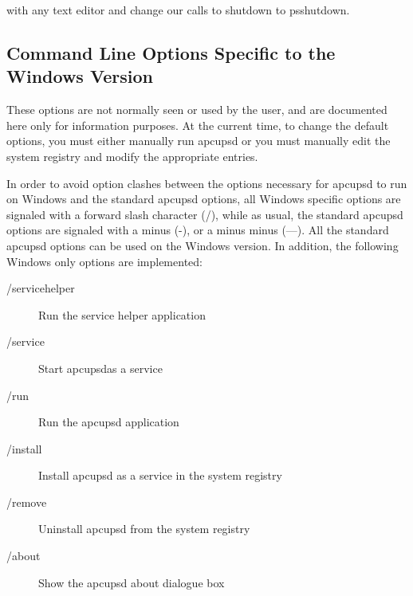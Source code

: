 {{{{{{{{{{with any text editor and change our calls to shutdown to psshutdown. 

\label{Command-Line-Options-Specific-to-the-Windows-Version}

\subsection*{Command Line Options Specific to the Windows Version}

\label{index-Windows_002c-Options-186}
These options are not normally seen or used by the user, and are documented
here only for information purposes. At the current time, to change the default
options, you must either manually run apcupsd or you must manually edit the
system registry and modify the appropriate entries.  

In order to avoid option clashes between the options necessary for apcupsd to
run on Windows and the standard apcupsd options, all Windows specific options
are signaled with a forward slash character (/), while as usual, the standard
apcupsd options are signaled with a minus (-), or a minus minus ({---}). All
the standard apcupsd options can be used on the Windows version. In addition,
the following Windows only options are implemented:  

\begin{description}

\item [/servicehelper]
   Run the service helper application  

\item [/service]
   Start apcupsdas a service  

\item [/run]
   Run the apcupsd application  

\item [/install]
   Install apcupsd as a service in the system registry  

\item [/remove]
   Uninstall apcupsd from the system registry  

\item [/about]
   Show the apcupsd about dialogue box  


\end{description}}}}}}}}}}}
